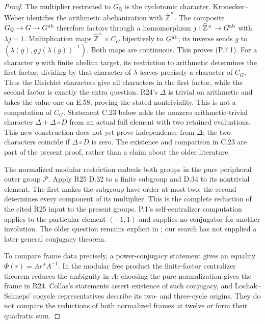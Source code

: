\begin{proof}
The multiplier restricted to $G_{\mathbb Q}$ is the
cyclotomic character. Kronecker--Weber identifies the
arithmetic abelianization with
$\widehat{\mathbb Z}^{\times}$. The composite
$G_{\mathbb Q}\to G\to G^{\rm ab}$ therefore factors
through a homomorphism
$j:\widehat{\mathbb Z}^{\times}\to G^{\rm ab}$ with
$\lambda j=1$. Multiplication maps
$\widehat{\mathbb Z}^{\times}\times C_G$ bijectively
to $G^{\rm ab}$; its inverse sends $g$ to
$(\lambda(g),g\,j(\lambda(g))^{-1})$. Both maps are
continuous. This proves (P.7.1).
For a character $\eta$ with finite abelian target,
its restriction to arithmetic determines the first
factor; dividing by that character of $\lambda$
leaves precisely a character of $C_G$. Thus the
Dirichlet characters give all characters in the first
factor, while the second factor is exactly the extra
question. R24's $\Delta$ is trivial on arithmetic and
takes the value one on E.58, proving the stated
nontriviality. This is not a computation of $C_G$.
Statement C.23 below adds the nonzero arithmetic-trivial character
$\Delta+\Delta\circ D$ from an actual full element with two
retained evaluations. This new construction does not yet prove
independence from $\Delta$: the two characters coincide if
$\Delta\circ D$ is zero. The existence and comparison in C.23
are part of the present proof, rather than a claim about the older
literature.

The normalized modular restriction embeds both groups
in the pure peripheral outer group $\mathcal P$.
Apply R25 D.32 to a finite subgroup and D.34 to its
nontrivial element. The first makes the subgroup have
order at most two; the second determines every
component of its multiplier. This is the complete
reduction of the cited R25 input to the present groups.
P.1's self-centralizer computation applies to the
particular element $(-1,1)$ and supplies no conjugator
for another involution. The older question remains
explicit in \cite[\S1.4, questions (2), (4)]{PBC_SchnepsSurvey};
our search has not supplied a later general conjugacy
theorem.

To compare frame data precisely, a power-conjugacy
statement gives an equality
$\Phi(r)=A r^{\lambda}A^{-1}$. In the modular
free product the finite-factor centralizer theorem
reduces the ambiguity in $A$; choosing the pure
normalization gives the frame in R24. Collas's
statements assert existence of such conjugacy, and
Lochak--Schneps' cocycle representatives describe its
two- and three-cycle origins. They do not compare
the reductions of both normalized frames at twelve
or form their quadratic sum.


\end{proof}

